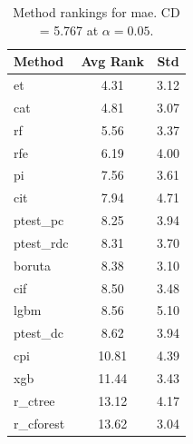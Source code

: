 \begin{table}[h]
\centering
\caption{Method rankings for mae. CD = 5.767 at $\alpha=0.05$.}
\label{tab:ranks_mae}
\begin{tabular}{lcc}
\toprule
Method & Avg Rank & Std \\
\midrule
et & 4.31 & 3.12 \\
cat & 4.81 & 3.07 \\
rf & 5.56 & 3.37 \\
rfe & 6.19 & 4.00 \\
pi & 7.56 & 3.61 \\
cit & 7.94 & 4.71 \\
ptest_pc & 8.25 & 3.94 \\
ptest_rdc & 8.31 & 3.70 \\
boruta & 8.38 & 3.10 \\
cif & 8.50 & 3.48 \\
lgbm & 8.56 & 5.10 \\
ptest_dc & 8.62 & 3.94 \\
cpi & 10.81 & 4.39 \\
xgb & 11.44 & 3.43 \\
r_ctree & 13.12 & 4.17 \\
r_cforest & 13.62 & 3.04 \\
\bottomrule
\end{tabular}
\end{table}